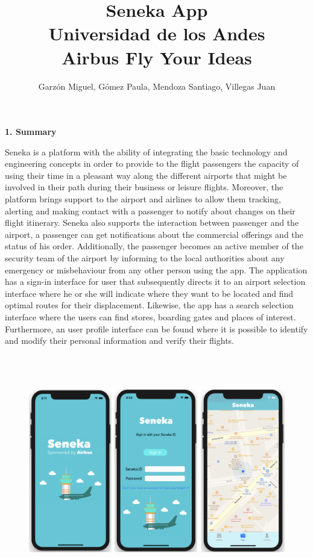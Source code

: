 \documentclass[]{article}
\begin{document}
\title{Seneka App\\
Universidad de los Andes\\
Airbus Fly Your Ideas}
\author{Garzón Miguel, Gómez Paula, Mendoza Santiago, Villegas Juan}
\maketitle


\Large{\textbf{1. Summary}\\}

Seneka is a platform with the ability of integrating the basic technology and engineering concepts in order to provide to the flight passengers the capacity of using their time in a pleasant way along the different airports that might be involved in their path during their business or leisure flights. Moreover, the platform brings support to the airport and airlines to allow them tracking, alerting and making contact with a passenger to notify about changes on their flight itinerary. Seneka also supports the interaction between passenger and the airport, a passenger can get notifications about the commercial offerings and the status of his order. Additionally, the passenger becomes an active member of the security team of the airport by informing to the local authorities about any emergency or misbehaviour from any other person using the app. The application has a sign-in interface for user that subsequently directs it to an airport selection interface where he or she will indicate where they want to be located and find optimal routes for their displacement. Likewise, the app has a search selection interface where the users can find stores, boarding gates and places of interest. Furthermore, an user profile interface can be found where it is possible to identify and modify their personal information and verify their flights.\\


\begin{figure}[H]
\centering
\includegraphics[height=4.0in]{Figura_1.jpg}
\end{figure}
\end{document}

